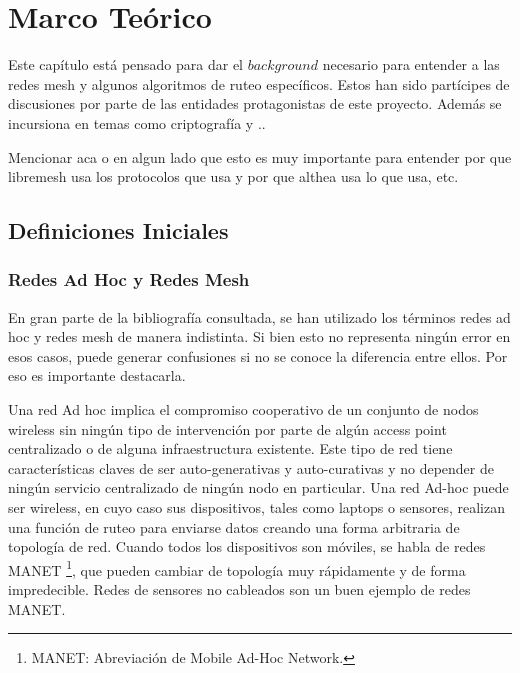 
\chapter{Marco Teórico} %

\label{Chapter2} %


Este capítulo está pensado para dar el $background$ necesario para entender a las redes mesh y algunos algoritmos de ruteo específicos. Estos han sido partícipes de discusiones por parte de las entidades protagonistas de este proyecto. Además se incursiona en temas como criptografía y ..


Mencionar aca o en algun lado que esto es muy importante para entender por que libremesh usa los protocolos que usa y por que althea usa lo que usa, etc.

\section{Definiciones Iniciales}

\subsection{Redes Ad Hoc y Redes Mesh}

En gran parte de la bibliografía consultada, se han utilizado los términos redes ad hoc y redes mesh de manera indistinta. Si bien esto no representa ningún error en esos casos, puede generar confusiones si no se conoce la diferencia entre ellos. Por eso es importante destacarla.

Una red Ad hoc implica el compromiso cooperativo de un conjunto de nodos wireless sin ningún tipo de intervención por parte de algún access point centralizado o de alguna infraestructura existente. Este tipo de red tiene características claves de ser auto-generativas y auto-curativas y no depender de ningún servicio centralizado de ningún nodo en particular. Una red Ad-hoc puede ser wireless, en cuyo caso sus dispositivos, tales como laptops o sensores, realizan una función de ruteo para enviarse datos creando una forma arbitraria de topología de red. Cuando todos los dispositivos son móviles, se habla de redes MANET \footnote{MANET: Abreviación de Mobile Ad-Hoc Network.}, que pueden cambiar de topología muy rápidamente y de forma impredecible. Redes de sensores no cableados son un buen ejemplo de redes MANET.

